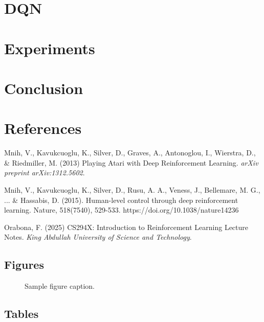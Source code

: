 \documentclass{article}
\begin{document}
\section{DQN}

\section{Experiments}

\section{Conclusion}

\section*{References}

\begin{thebibliography}{2}

Mnih, V., Kavukcuoglu, K., Silver, D., Graves, A., Antonoglou, I., Wierstra, D., \& Riedmiller, M. (2013) Playing Atari with Deep Reinforcement Learning. {\it arXiv preprint arXiv:1312.5602}.

Mnih, V., Kavukcuoglu, K., Silver, D., Rusu, A. A., Veness, J., Bellemare, M. G., ... \& Hassabis, D. (2015). Human-level control through deep reinforcement learning. Nature, 518(7540), 529-533. https://doi.org/10.1038/nature14236

Orabona, F. (2025) CS294X: Introduction to Reinforcement Learning Lecture Notes. {\it King Abdullah University of Science and Technology}.

\end{thebibliography}

\pagebreak

\subsection{Figures}


\begin{figure}
  \centering
  \fbox{\rule[-.5cm]{0cm}{4cm} \rule[-.5cm]{4cm}{0cm}}
  \caption{Sample figure caption.}
\end{figure}



\subsection{Tables}
\end{document}
